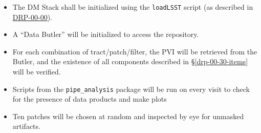 \begin{itemize}

  \item{The DM Stack shall be initialized using the \texttt{loadLSST} script
  (as described in \hyperref[drp-00-00]{DRP-00-00}).}

  \item{A ``Data Butler'' will be initialized to access the repository.}

  \item{For each combination of tract/patch/filter, the PVI will be retrieved
  from the Butler, and the existence of all components described in
  \S\ref{drp-00-30-items} will be verified.}

  \item{Scripts from the \texttt{pipe\_analysis} package will be run on every visit to check for the presence of data products and make plots}

  \item{Ten patches will be chosen at random and inspected by eye for unmasked artifacts.}

\end{itemize}
